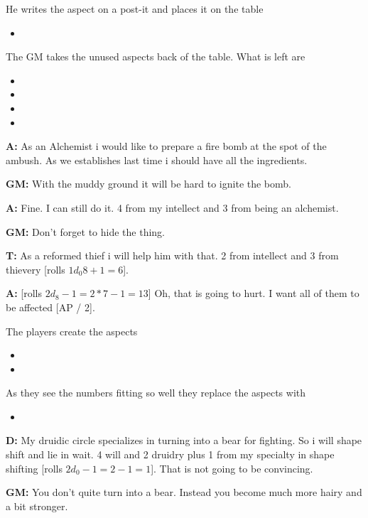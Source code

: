 \documentclass[11pt]{article}
\begin{document}
{He writes the aspect on a post-it and places it on the table
\begin{itemize}
\item {}
\end{itemize}
The GM takes the unused aspects back of the table. What is left are
\begin{itemize}
\item {}
\item {}
\item {}
\item {}
\end{itemize}

\textbf{A:} As an Alchemist i would like to prepare a fire bomb at the spot of the ambush. As we establishes last time i should have all the ingredients.

\textbf{GM:} With the muddy ground it will be hard to ignite the bomb.

\textbf{A:} Fine. I can still do it. 4 from my intellect and 3 from being an alchemist.

\textbf{GM:} Don't forget to hide the thing.

\textbf{T:} As a reformed thief i will help him with that. 2 from intellect and 3 from thievery [rolls \(1 d_0 8 + 1 = 6\)].

\textbf{A:} {[}rolls \(2 d_8 - 1 = 2*7 -1 = 13\)] Oh, that is going to hurt. I want all of them to be affected [AP / 2].

The players create the aspects
\begin{itemize}
\item {}
\item {}
\end{itemize}
As they see the numbers fitting so well they replace the aspects with
\begin{itemize}
\item {}
\end{itemize}

\textbf{D:} My druidic circle specializes in turning into a bear for fighting. So i will shape shift and lie in wait. 4 will and 2 druidry plus 1 from my specialty in shape shifting [rolls \(2 d_0 - 1 = 2 - 1 = 1\)]. That is not going to be convincing.

\textbf{GM:} You don't quite turn into a bear. Instead you become much more hairy and a bit stronger.

}
\end{document}

